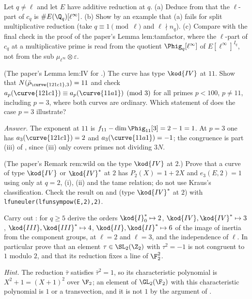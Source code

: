 \begin{exercise}\label{ex:galrep:tamagawa-l-part}
Let $q\ne\ell$ and let $E$ have additive reduction at $q$. (a) Deduce from  that the $\ell$-part of $c_q$ is
$\#E(\Q_q)[\ell^\infty]$. (b) Show by an example that (a) fails for split multiplicative reduction (take $q\equiv1\pmod\ell$ and $\ell\nmid n_q$). (c) Compare with the final
check in the proof of the paper's Lemma lem:tamfactor, where the $\ell$-part of $c_q$ at a multiplicative prime is read from the quotient
$\Phig_q[\ell^\infty]$ of $E[\ell^\infty]^{I_q}$, not from the sub $\mu_{\ell^\infty}\otimes\varepsilon$.
\end{exercise}

\begin{exercise}\label{ex:galrep:121c1}
(The paper's Lemma lem:IV for .) The curve  has type $\kod{IV}$ at $11$. Show that $N(\bar\rho_{\curve{121c1},3})=11$ and check
$a_p(\curve{121c1})\equiv a_p(\curve{11a1})\pmod3$ for all primes $p<100$, $p\ne11$, including $p=3$, where both curves are ordinary. Which statement of
 does the case $p=3$ illustrate?

\emph{Answer.} The exponent at $11$ is $f_{11}-\dim\Phig_{11}[3]=2-1=1$. At $p=3$ one has $a_3(\curve{121c1})=2$ and $a_3(\curve{11a1})=-1$; the congruence is part (iii) of
, since (iii) only covers primes not dividing $3N$.
\end{exercise}

\begin{exercise}\label{ex:galrep:IV-at-2}
(The paper's Remark rem:wild on the type $\kod{IV}$ at $2$.) Prove that a curve of type $\kod{IV}$ or $\kod{IV}^*$ at $2$ has $P_2(X)=1+2X$ and $e_3(E,2)=1$ using only
 at $q=2$, (i), (ii) and the tame relation; do not use Kraus's classification. Check the
result on  and  (type $\kod{IV}^*$ at $2$) with \texttt{lfuneuler(lfunsympow(E,2),2)}.
\end{exercise}

\begin{exercise}\label{ex:galrep:kraus}
Carry out : for $q\ge5$ derive the orders $\kod{I}_0^*\mapsto2$, $\kod{IV},\kod{IV}^*\mapsto3$, $\kod{III},\kod{III}^*\mapsto4$, $\kod{II},\kod{II}^*\mapsto6$
of the image of inertia from the component groups,  at $\ell=2$ and $\ell=3$, and the independence of $\ell$. In particular
prove that an element $\tau\in\SL_2(\Z_2)$ with $\tau^2=-1$ is not congruent to $1$ modulo $2$, and that its reduction fixes a line of $\F_2^2$.

\emph{Hint.} The reduction $\bar\tau$ satisfies $\bar\tau^2=1$, so its characteristic polynomial is $X^2+1=(X+1)^2$ over $\F_2$; an element of $\GL_2(\F_2)$ with this
characteristic polynomial is $1$ or a transvection, and it is not $1$ by the argument of .
\end{exercise}

